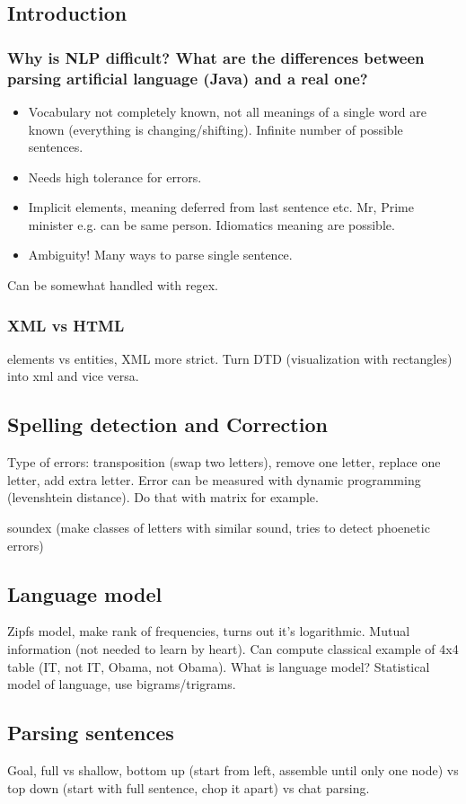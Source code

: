 \documentclass[11pt]{article}
\begin{document}
\subsection{Introduction}
\subsubsection{Why is NLP difficult? What are the differences between parsing artificial language (Java) and 
a real one?}
\begin{itemize}
	\item Vocabulary not completely known, not all meanings of a single word are known (everything is 
changing/shifting). Infinite number of possible sentences.
	\item Needs high tolerance for errors.
	\item Implicit elements, meaning deferred from last sentence etc. Mr, Prime minister e.g. 
	can be same person. Idiomatics meaning are possible. 
	\item Ambiguity! Many ways to parse single sentence.
\end{itemize}
Can be somewhat handled with regex. 
\subsubsection{XML vs HTML}
elements vs entities, XML more strict. Turn DTD (visualization with rectangles) 
into xml and vice versa.
\subsection{Spelling detection and Correction}
Type of errors: transposition (swap two letters), remove one letter, replace one letter, add extra letter. Error can be measured with dynamic programming (levenshtein distance). Do that
with matrix for example. 

soundex (make classes of letters with similar sound, tries to detect phoenetic
errors)

\subsection{Language model}
Zipfs model, make rank of frequencies, turns out it's logarithmic. 
Mutual information (not needed to learn by heart). Can compute classical example of 4x4 table
(IT, not IT, Obama, not Obama).
What is language model? Statistical model of language, use bigrams/trigrams. 

\subsection{Parsing sentences}
Goal, full vs shallow, bottom up (start from left, assemble until only one node) vs top down (start with full sentence, chop it apart) vs chat parsing. 
\end{document}
